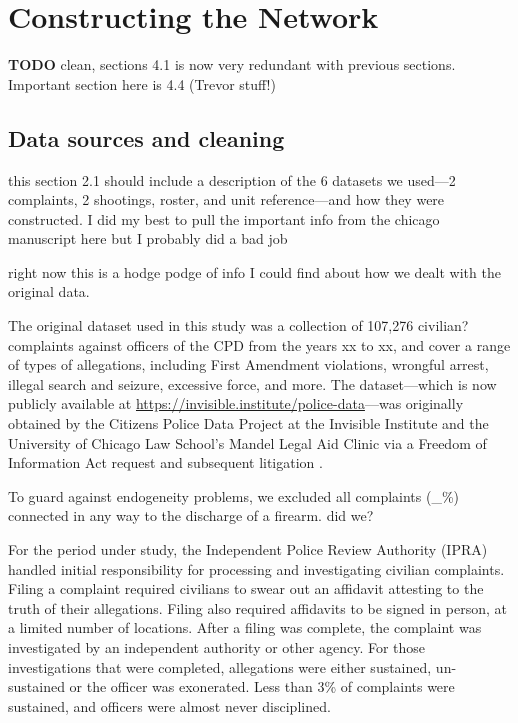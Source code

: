\section{Constructing the Network}\label{sec:data}

\textbf{TODO} clean, sections 4.1 is now very redundant with previous sections.
Important section here is 4.4 (Trevor stuff!)

\subsection{Data sources and cleaning}

{\color{red} this section 2.1 should include a description of the 6 datasets we used---2 complaints, 2 shootings, roster, and unit reference---and how they were constructed. I did my best to pull the important info from the chicago manuscript here but I probably did a bad job }

{\color{red} right now this is a hodge podge of info I could find about how we dealt with the original data.}

The original dataset used in this study was a collection of
107,276 {\color{red} civilian?} complaints against officers of the CPD
from the years {\color{red} xx to xx}, and cover a range of types of
allegations, including First Amendment violations, wrongful arrest, illegal
search and seizure, excessive force, and more.
The dataset---which is now publicly available at \url{https://invisible.institute/police-data}---was 
originally obtained  by the Citizens Police Data Project at the Invisible
Institute and the University of Chicago Law School’s Mandel Legal Aid Clinic
via a Freedom of Information Act request and subsequent litigation \cite{xx}.

To guard against endogeneity problems,
we excluded all complaints  {\color{red}(\_\%)} connected in any way to the discharge of a
firearm. {\color{red} did we?}

For the period under study, the Independent Police Review Authority (IPRA)
handled initial responsibility for processing and investigating civilian
complaints. Filing a complaint
required civilians to swear out an affidavit attesting to the truth of their
allegations. Filing also required affidavits to be signed in person, at a
limited number of locations. After a filing was complete, the complaint was
investigated by an independent authority or other agency. For those
investigations that were completed, allegations were either sustained,
un-sustained or the officer was exonerated. 
Less than 3\% of complaints were
sustained, and officers were almost never disciplined. 




